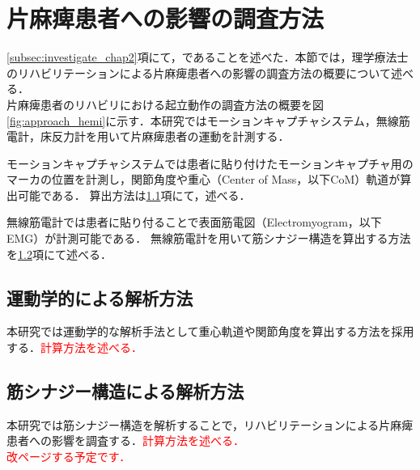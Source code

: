 \section{片麻痺患者への影響の調査方法}
\label{sec:method_chap3}
\ref{subsec:investigate_chap2}項にて，であることを述べた．本節では，理学療法士のリハビリテーションによる片麻痺患者への影響の調査方法の概要について述べる．\\

片麻痺患者のリハビリにおける起立動作の調査方法の概要を図\ref{fig:approach_hemi}に示す．本研究ではモーションキャプチャシステム，無線筋電計，床反力計を用いて片麻痺患者の運動を計測する．

モーションキャプチャシステムでは患者に貼り付けたモーションキャプチャ用のマーカの位置を計測し，関節角度や重心（Center of Mass，以下CoM）軌道が算出可能である．
算出方法は\ref{subsec:method_kinematics_chap3}項にて，述べる．

無線筋電計では患者に貼り付ることで表面筋電図（Electromyogram，以下EMG）が計測可能である．
無線筋電計を用いて筋シナジー構造を算出する方法を\ref{subsec:method_synergy_chap3}項にて述べる．\\


\subsection{運動学的による解析方法}
\label{subsec:method_kinematics_chap3}
本研究では運動学的な解析手法として重心軌道や関節角度を算出する方法を採用する．\textcolor{red}{計算方法を述べる．}\\

\subsection{筋シナジー構造による解析方法}
\label{subsec:method_synergy_chap3}
本研究では筋シナジー構造を解析することで，リハビリテーションによる片麻痺患者への影響を調査する．\textcolor{red}{計算方法を述べる．}\\

\textcolor{red}{改ページする予定です．}
